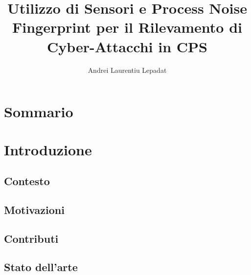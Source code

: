 \documentclass[Lau,binding=0.6cm]{sapthesis}
\title{Utilizzo di Sensori e Process Noise Fingerprint per il Rilevamento di Cyber-Attacchi in CPS}
\author{Andrei Laurentiu Lepadat}
\begin{document}
\frontmatter

\maketitle

\dedication{Decidere se inserire. Ne vale la pena?}


\tableofcontents

\chapter{Sommario} 


\mainmatter

\chapter{Introduzione}

\section{Contesto}

\section{Motivazioni}

\section{Contributi}

\section{Stato dell'arte}
\end{document}
